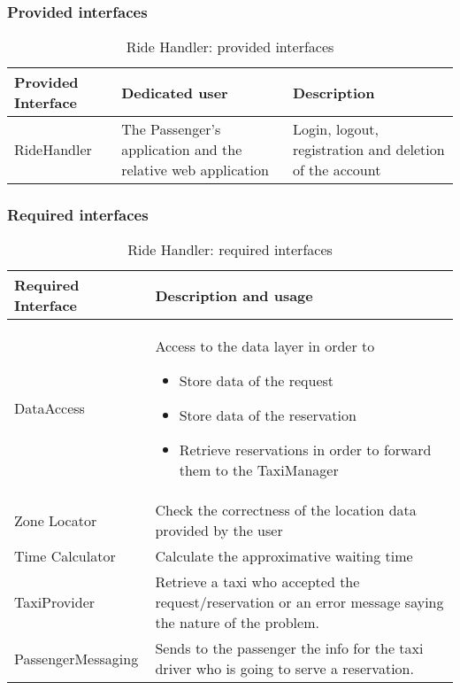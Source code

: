 \subsubsection{Provided interfaces}
\begin{table}[H]
\begin{longtable}{| p{} | p{} | p{} |}
\hline
 \textbf{Provided Interface} & \textbf{Dedicated user} & \textbf{Description} \\ \hline
RideHandler & The Passenger's application and the relative web application & Login, logout, registration and deletion of the account \\ \hline
\end{longtable}
\caption{Ride Handler: provided interfaces}
\label{tab:rideHandler:providedInterfaces}
\end{table}
\subsubsection{Required interfaces}
\begin{table}[H]
\begin{longtable}{| l | p{} |}
\hline
 \textbf{Required Interface} & \textbf{Description and usage} \\ \hline
DataAccess & Access to the data layer in order to 
			\begin{itemize}
				\item Store data of the request
				\item Store data of the reservation
				\item Retrieve reservations in order to forward them to the TaxiManager
			\end{itemize} \\ \hline
Zone Locator & Check the correctness of the location data provided by the user \\ \hline
Time Calculator & Calculate the approximative waiting time \\ \hline
TaxiProvider & Retrieve a taxi who accepted the request/reservation or an error message saying the nature of the problem. \\ \hline
PassengerMessaging & Sends to the passenger the info for the taxi driver who is going to serve a reservation. \\ \hline
\end{longtable}
\caption{Ride Handler: required interfaces}
\label{tab:rideHandler:requiredInterfaces}
\end{table}

